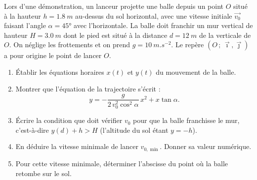 \documentclass[11pt]{article}
\begin{document}
\begin{exercice}
Lors d'une démonstration, un lanceur projette une balle depuis un point $O$ situé à la hauteur $h = \SI{1,8}{m}$ au-dessus du sol horizontal, avec une vitesse initiale $\vec{v_0}$ faisant l'angle $\alpha = 45°$ avec l'horizontale. La balle doit franchir un mur vertical de hauteur $H = \SI{3,0}{m}$ dont le pied est situé à la distance $d = \SI{12}{m}$ de la verticale de $O$. On néglige les frottements et on prend $g = \SI{10}{m.s^{-2}}$. Le repère $(O\,;\,\vec{\imath},\vec{\jmath})$ a pour origine le point de lancer $O$.
\begin{enumerate}
\item Établir les équations horaires $x(t)$ et $y(t)$ du mouvement de la balle.
\item Montrer que l'équation de la trajectoire s'écrit :
\[ y = -\frac{g}{2\,v_0^2\cos^2\alpha}\,x^2 + x\tan\alpha. \]
\item Écrire la condition que doit vérifier $v_0$ pour que la balle franchisse le mur, c'est-à-dire $y(d) + h > H$ (l'altitude du sol étant $y = -h$).
\item En déduire la vitesse minimale de lancer $v_{0,\min}$. Donner sa valeur numérique.
\item Pour cette vitesse minimale, déterminer l'abscisse du point où la balle retombe sur le sol.
\end{enumerate}
\end{exercice}
\end{document}
